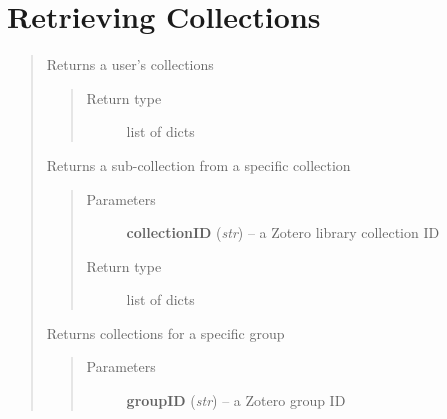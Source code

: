 \documentclass[letterpaper,10pt,english]{sphinxmanual}
\begin{document}
\section{Retrieving Collections}
\label{index:retrieving-collections}\begin{quote}


\begin{fulllineitems}
\label{index:pyzotero.zotero.Zotero.collections}
Returns a user's collections
\begin{quote}\begin{description}
\item[{Return type}] \leavevmode
list of dicts

\end{description}\end{quote}

\end{fulllineitems}



\begin{fulllineitems}
\label{index:pyzotero.zotero.Zotero.collections_sub}
Returns a sub-collection from a specific collection
\begin{quote}\begin{description}
\item[{Parameters}] \leavevmode
\textbf{collectionID} (\emph{str}) -- a Zotero library collection ID

\item[{Return type}] \leavevmode
list of dicts

\end{description}\end{quote}

\end{fulllineitems}



\begin{fulllineitems}
\label{index:pyzotero.zotero.Zotero.group_collections}
Returns collections for a specific group
\begin{quote}\begin{description}
\item[{Parameters}] \leavevmode
\textbf{groupID} (\emph{str}) -- a Zotero group ID


\end{description}
\end{quote}
\end{fulllineitems}
\end{quote}
\end{document}

